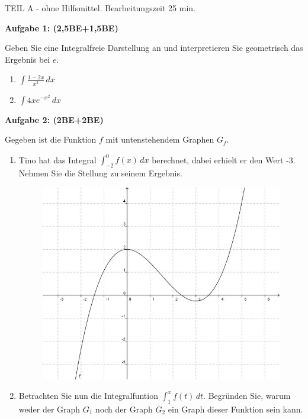 \documentclass[a4paper,12pt]{article}
\newcommand{\Aufgabe}[1]{
  {
  \vspace*{0.5cm}
  \textsf{\textbf{Aufgabe #1}}
  \vspace*{0.2cm}
  
  }
}
\begin{document}
\vspace{0.3cm}
\newpage
\vspace{1,5cm} {TEIL A} - ohne Hilfsmittel. Bearbeitungszeit 25 min.
\vspace {0,2cm}

\Aufgabe{1: (2,5BE+1,5BE)}

Geben Sie eine Integralfreie Darstellung an und interpretieren Sie geometrisch das Ergebnis bei $e$.
\begin{enumerate}[label={\alph*)}]
  \item $\int \frac{1-2x}{x^2}\, dx$
  \item $\int 4xe^{-x^2}\, dx$
\end{enumerate}

\Aufgabe{2: (2BE+2BE)}
Gegeben ist die Funktion $f$ mit untenstehendem Graphen $G_f$.
\begin{enumerate}[label={\alph*)}]
  \item Tino hat das Integral $\int_{-2}^{0} f(x)\, dx$ berechnet, dabei erhielt er den Wert -3. Nehmen Sie die Stellung zu seinem Ergebnis.
  \begin{figure}[H]
    \vspace{0cm}
    \centering
    \includegraphics[width=0.5\linewidth]{Q12_SA_240103_1.jpg}
  \end{figure}

\item Betrachten Sie nun die Integralfuntion $\int_1^{x} f(t)\, dt$. Begründen Sie, warum weder der Graph $G_1$ noch der Graph $G_2$ ein Graph dieser Funktion sein kann.


\end{enumerate}
\end{document}
